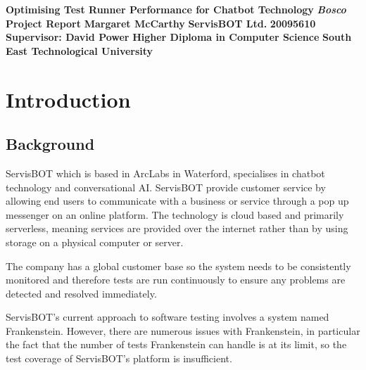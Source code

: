 \documentclass[12pt,a4paper,titlepage]{report}
\newcommand\AcademicTitle{Optimising Test Runner Performance for Chatbot Technology}
\newcommand\CommercialTitle{Bosco}
\newcommand\Author{Margaret McCarthy}
\newcommand\StudentID{20095610}
\newcommand\Report{Project Report}
\newcommand\Stakeholder{ServisBOT Ltd.}
\newcommand\Course{Higher Diploma in Computer Science}
\newcommand\Reader{Supervisor: David Power}
\newcommand\University{South East Technological University}
\begin{document}

\thispagestyle{empty}
\begin{center}
 \mbox{}\vfill
 {\fontsize{17pt}{20pt}\selectfont \bfseries \AcademicTitle}
 \vfill
 {\fontsize{14pt}{20pt}\selectfont \bfseries\itshape \CommercialTitle}
 \vfill
 {\fontsize{12pt}{20pt}\selectfont \bfseries \Report}
 \vfill
 {\fontsize{14pt}{20pt}\selectfont \bfseries \Author}
 \vfill
 {\fontsize{14pt}{20pt}\selectfont \bfseries \Stakeholder}
 \vfill
 {\fontsize{14pt}{20pt}\selectfont \bfseries \StudentID}
 \vfill
 {\fontsize{14pt}{20pt}\selectfont \bfseries \Reader}
 \vfill
 {\fontsize{14pt}{20pt}\selectfont \bfseries \Course}
 \vfill
 {\fontsize{14pt}{20pt}\selectfont \bfseries \University}
 \vfill
\end{center}
\clearpage

\tableofcontents

\listoftables

\listoffigures

\clearpage
{}
\setcounter{page}{1}

\chapter{Introduction}

\section{Background}

ServisBOT which is based in ArcLabs in Waterford, specialises in chatbot technology and
conversational AI. ServisBOT provide customer service by allowing end users to
communicate with a business or service through a pop up messenger on an online platform.
The technology is cloud based and primarily serverless, meaning services are provided over
the internet rather than by using storage on a physical computer or server. 

The company has a global customer base so the system needs to be consistently monitored and therefore
tests are run continuously to ensure any problems are detected and resolved immediately.

ServisBOT's current approach to software testing involves a system named Frankenstein. 
However, there are numerous issues with Frankenstein, in particular the fact that the number of tests Frankenstein can handle is at its limit, so the test coverage of ServisBOT's platform is insufficient. 
\end{document}
